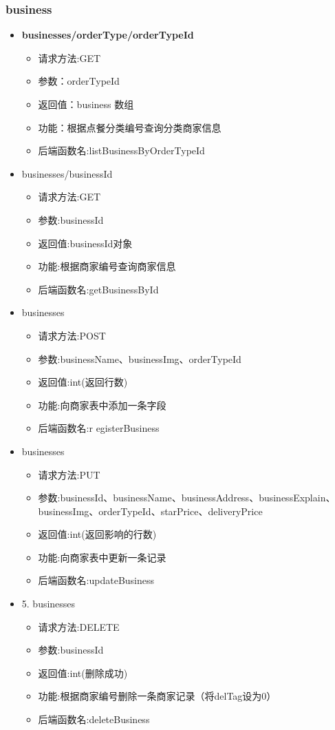 \subsubsection*{business}
\begin{itemize}
    \item \textbf{ businesses/orderType/{orderTypeId}}
    \begin{itemize}
    \item 请求方法:GET
    \item 参数：orderTypeId
    \item 返回值：business 数组
    \item 功能：根据点餐分类编号查询分类商家信息
    \item 后端函数名:listBusinessByOrderTypeId
    \end{itemize}
    \item businesses/{businessId}
    \begin{itemize}
    \item 请求方法:GET
    \item 参数:businessId
    \item 返回值:businessId对象
    \item 功能:根据商家编号查询商家信息
    \item 后端函数名:getBusinessById
    \end{itemize}
    \item businesses
    \begin{itemize}
    \item 请求方法:POST
    \item 参数:businessName、businessImg、orderTypeId
    \item 返回值:int(返回行数)
    \item 功能:向商家表中添加一条字段
    \item 后端函数名:r egisterBusiness
    \end{itemize}
    \item businesses
    \begin{itemize}
    \item 请求方法:PUT
    \item 参数:businessId、businessName、businessAddress、businessExplain、businessImg、orderTypeId、starPrice、deliveryPrice
    \item 返回值:int(返回影响的行数)
    \item 功能:向商家表中更新一条记录
    \item 后端函数名:updateBusiness
    \end{itemize}
    \item 5. businesses
    \begin{itemize}
    \item 请求方法:DELETE
    \item 参数:businessId
    \item 返回值:int(删除成功)
    \item 功能:根据商家编号删除一条商家记录（将delTag设为0）
    \item 后端函数名:deleteBusiness
    \end{itemize}
\end{itemize}

